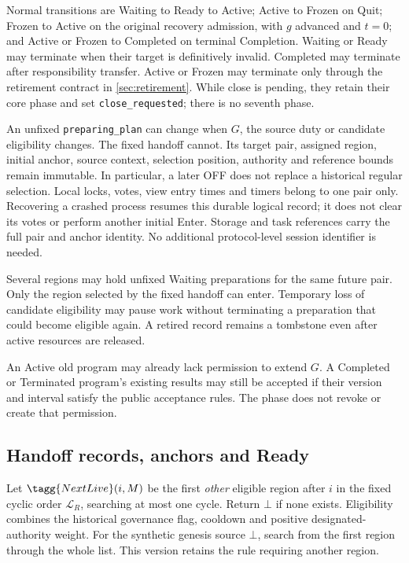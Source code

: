 Normal transitions are Waiting to Ready to Active; Active to Frozen
on Quit; Frozen to Active on the original recovery admission, with
$g$ advanced and $t=0$; and Active or Frozen to Completed on terminal
Completion. Waiting or Ready may terminate when their target is
definitively invalid. Completed may terminate after responsibility
transfer. Active or Frozen may terminate only through the retirement
contract in \cref{sec:retirement}. While close is pending, they retain
their core phase and set \texttt{close\_requested}; there is no seventh
phase.

An unfixed \texttt{preparing\_plan} can change when $G$, the source
duty or candidate eligibility changes. The fixed handoff cannot.
Its target pair, assigned region, initial anchor, source context,
selection position, authority and reference bounds remain immutable.
In particular, a later OFF does not replace a historical regular
selection. Local locks, votes, view entry times and timers belong to
one pair only. Recovering a crashed process resumes this durable
logical record; it does not clear its votes or perform another initial
Enter. Storage and task references carry the full pair and anchor
identity. No additional protocol-level session identifier is needed.

Several regions may hold unfixed Waiting preparations for the same
future pair. Only the region selected by the fixed handoff can enter.
Temporary loss of candidate eligibility may pause work without
terminating a preparation that could become eligible again. A retired
record remains a tombstone even after active resources are released.

An Active old program may already lack permission to extend $G$.
A Completed or Terminated program's existing results may still be
accepted if their version and interval satisfy the public acceptance
rules. The phase does not revoke or create that permission.

\subsection{Handoff records, anchors and Ready}
\label{sec:witness}
Let $\tagg{NextLive}(i,M)$ be the first \emph{other} eligible region
after $i$ in the fixed cyclic order $\mathcal L_R$, searching at most
one cycle. Return $\bot$ if none exists. Eligibility combines the
historical governance flag, cooldown and positive designated-authority
weight. For the synthetic genesis source $\bot$, search from the first
region through the whole list. This version retains the rule requiring
another region.


